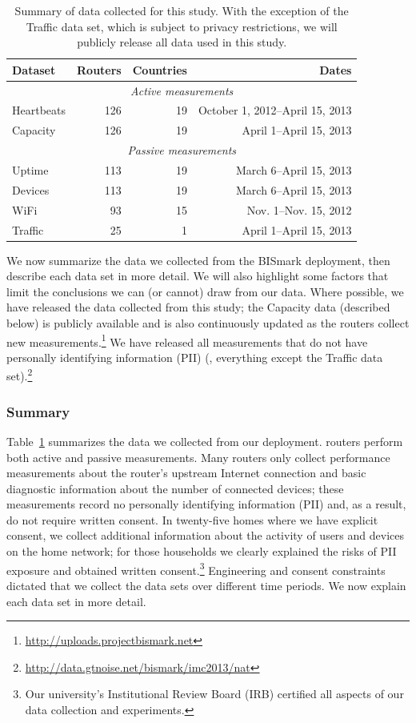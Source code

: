 \begin{table}[t]
    \small
    \begin{tabular}{l|r|r|r}
        Dataset & Routers & Countries & Dates \\
        \hline
        \multicolumn{4}{c}{{\em Active measurements}} \\ \hline
        Heartbeats & 126 & 19 & October 1, 2012--April 15, 2013 \\
        Capacity & 126 & 19 & April 1--April 15, 2013 \\ \hline
        \multicolumn{4}{c}{{\em Passive measurements}} \\ \hline
        Uptime & 113 & 19 & March 6--April 15, 2013 \\
        Devices & 113 & 19 & March 6--April 15, 2013 \\ %
        WiFi & 93 & 15 & Nov. 1--Nov. 15, 2012 \\
        Traffic & 25 & 1 & April 1--April 15, 2013 \\
    \end{tabular}
    \caption{Summary of data collected for this study.  With the
      exception of the Traffic data set, which is subject to privacy
    restrictions, we will publicly release all data used in this study.}
    \label{table:datasets}
\end{table}

We now summarize the data we collected from the BISmark deployment, then
describe each data set in more detail.  We will also highlight some
factors that limit the conclusions we can (or cannot) draw from our
data.  Where possible, we have released the data collected from this
study; the Capacity data (described below) is publicly available and is
also continuously updated as the routers collect new
measurements.\footnote{\url{http://uploads.projectbismark.net}} We have
released all measurements that do not have personally identifying
information (PII) (\ie, everything except the Traffic data
set).\footnote{\url{http://data.gtnoise.net/bismark/imc2013/nat}}

\subsubsection{Summary}

Table~\ref{table:datasets} summarizes the data we collected from our deployment.
\name{} routers perform both active and passive measurements. Many routers only
collect performance measurements about the router's upstream Internet connection
and basic diagnostic information about the number of connected devices; these
measurements record no personally identifying information (PII) and, as a
result, do not require written consent. In twenty-five homes
where we have explicit consent, we collect additional information about the
activity of users and devices on the home network; for those households we
clearly explained the risks of PII exposure and obtained written
consent.\footnote{Our university's Institutional Review Board (IRB) certified
all aspects of our data collection and experiments.} Engineering and consent
constraints dictated that we collect the data sets over different time periods.
We now explain each data set in more detail.

